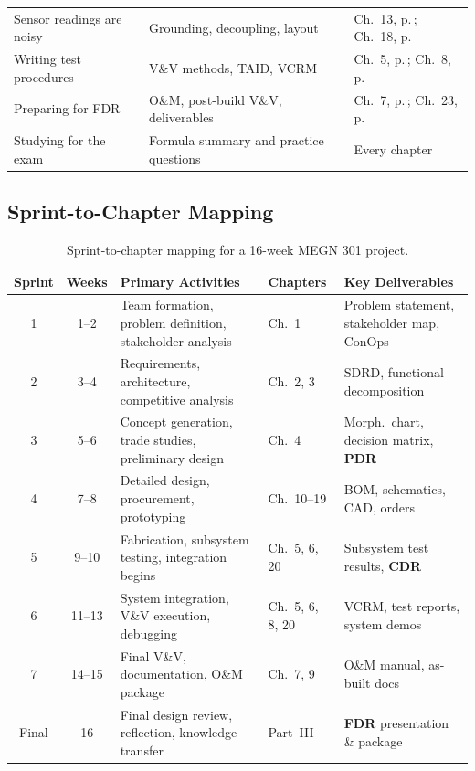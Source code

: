 \begin{center}
\begin{tabularx}{\textwidth}{l X l}
Sensor readings are noisy & Grounding, decoupling, layout & Ch.~13, p.\,\pageref{ch:electronics}; Ch.~18, p.\,\pageref{ch:pcb} \\
Writing test procedures & V\&V methods, TAID, VCRM & Ch.~5, p.\,\pageref{ch:vv}; Ch.~8, p.\,\pageref{ch:postbuild} \\
Preparing for FDR & O\&M, post-build V\&V, deliverables & Ch.~7, p.\,\pageref{ch:oandm}; Ch.~23, p.\,\pageref{ch:fdr} \\
Studying for the exam & Formula summary and practice questions & Every chapter \\
\bottomrule
\end{tabularx}
\end{center}

\subsection*{Sprint-to-Chapter Mapping}

\begin{table}[htbp]
\centering\small
\begin{tabularx}{\textwidth}{c c X l X}
\toprule
\textbf{Sprint} & \textbf{Weeks} & \textbf{Primary Activities} & \textbf{Chapters} & \textbf{Key Deliverables} \\
\midrule
1 & 1--2 & Team formation, problem definition, stakeholder analysis & Ch.~1 & Problem statement, stakeholder map, ConOps \\
2 & 3--4 & Requirements, architecture, competitive analysis & Ch.~2, 3 & SDRD, functional decomposition \\
3 & 5--6 & Concept generation, trade studies, preliminary design & Ch.~4 & Morph.\ chart, decision matrix, \textbf{PDR} \\
4 & 7--8 & Detailed design, procurement, prototyping & Ch.~10--19 & BOM, schematics, CAD, orders \\
5 & 9--10 & Fabrication, subsystem testing, integration begins & Ch.~5, 6, 20 & Subsystem test results, \textbf{CDR} \\
6 & 11--13 & System integration, V\&V execution, debugging & Ch.~5, 6, 8, 20 & VCRM, test reports, system demos \\
7 & 14--15 & Final V\&V, documentation, O\&M package & Ch.~7, 9 & O\&M manual, as-built docs \\
Final & 16 & Final design review, reflection, knowledge transfer & Part~III & \textbf{FDR} presentation \& package \\
\bottomrule
\end{tabularx}
\caption{Sprint-to-chapter mapping for a 16-week MEGN 301 project.}
\end{table}


